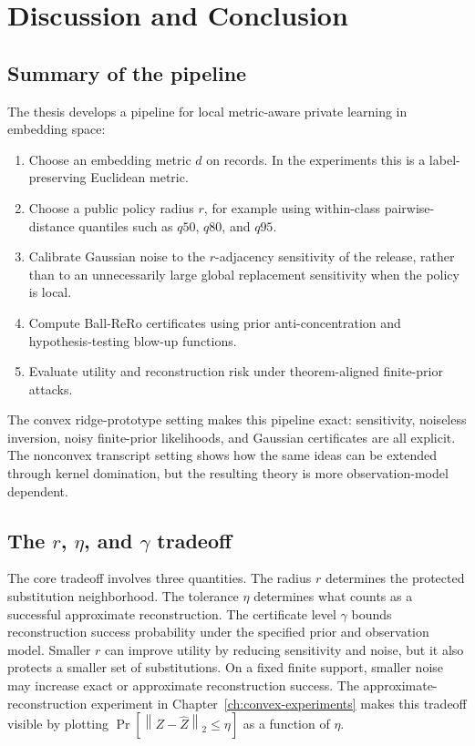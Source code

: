 \documentclass[11pt,a4paper]{report}
\theoremstyle{plain}
\theoremstyle{definition}
\theoremstyle{remark}
\newcommand{\norm}[1]{\left\lVert #1\right\rVert}
\begin{document}
\chapter{Discussion and Conclusion}
\label{ch:discussion-conclusion}

\section{Summary of the pipeline}
\label{sec:pipeline-summary}

The thesis develops a pipeline for local metric-aware private learning in embedding space:
\begin{enumerate}[leftmargin=1.5em]
    \item Choose an embedding metric $d$ on records.  In the experiments this is a label-preserving Euclidean metric.
    \item Choose a public policy radius $r$, for example using within-class pairwise-distance quantiles such as $q50$, $q80$, and $q95$.
    \item Calibrate Gaussian noise to the $r$-adjacency sensitivity of the release, rather than to an unnecessarily large global replacement sensitivity when the policy is local.
    \item Compute Ball-ReRo certificates using prior anti-concentration and hypothesis-testing blow-up functions.
    \item Evaluate utility and reconstruction risk under theorem-aligned finite-prior attacks.
\end{enumerate}

The convex ridge-prototype setting makes this pipeline exact: sensitivity, noiseless inversion, noisy finite-prior likelihoods, and Gaussian certificates are all explicit.  The nonconvex transcript setting shows how the same ideas can be extended through kernel domination, but the resulting theory is more observation-model dependent.

\section{The $r$, $\eta$, and $\gamma$ tradeoff}
\label{sec:r-eta-gamma-tradeoff}

The core tradeoff involves three quantities.  The radius $r$ determines the protected substitution neighborhood.  The tolerance $\eta$ determines what counts as a successful approximate reconstruction.  The certificate level $\gamma$ bounds reconstruction success probability under the specified prior and observation model.  Smaller $r$ can improve utility by reducing sensitivity and noise, but it also protects a smaller set of substitutions.  On a fixed finite support, smaller noise may increase exact or approximate reconstruction success.  The approximate-reconstruction experiment in Chapter~\ref{ch:convex-experiments} makes this tradeoff visible by plotting $\Pr[\norm{Z-\widehat Z}_2\le\eta]$ as a function of $\eta$.
\end{document}
